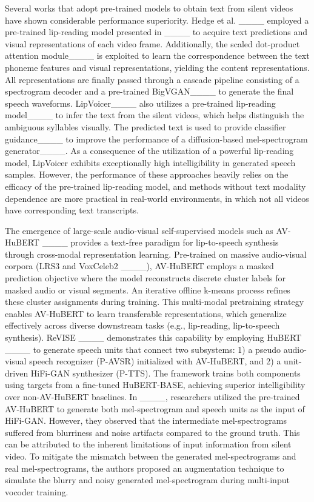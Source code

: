 Several works that adopt pre-trained models to obtain text from silent videos have shown considerable performance superiority. Hedge et al. ____ employed a pre-trained lip-reading model presented in ____ to acquire text predictions and visual representations of each video frame. Additionally, the scaled dot-product attention module____ is exploited to learn the correspondence between the text phoneme features and visual representations, yielding the content representations. All representations are finally passed through a cascade pipeline consisting of a spectrogram decoder and a pre-trained BigVGAN____ to generate the final speech waveforms. LipVoicer____ also utilizes a pre-trained lip-reading model____ to infer the text from the silent videos, which helps distinguish the ambiguous syllables visually. The predicted text is used to provide classifier guidance____ to improve the performance of a diffusion-based mel-spectrogram generator____. As a consequence of the utilization of a powerful lip-reading model, LipVoicer exhibits exceptionally high intelligibility in generated speech samples. However, the performance of these approaches heavily relies on the efficacy of the pre-trained lip-reading model, and methods without text modality dependence are more practical in real-world environments, in which not all videos have corresponding text transcripts. 

The emergence of large-scale audio-visual self-supervised models such as AV-HuBERT ____ provides a text-free paradigm for lip-to-speech synthesis through cross-modal representation learning. Pre-trained on massive audio-visual corpora (LRS3 and VoxCeleb2 ____), AV-HuBERT employs a masked prediction objective where the model reconstructs discrete cluster labels for masked audio or visual segments. An iterative offline k-means process refines these cluster assignments during training. This multi-modal pretraining strategy enables AV-HuBERT to learn transferable representations, which generalize effectively across diverse downstream tasks (e.g., lip-reading, lip-to-speech synthesis). ReVISE ____ demonstrates this capability by employing HuBERT ____ to generate speech units that connect two subsystems: 1) a pseudo audio-visual speech recognizer (P-AVSR) initialized with AV-HuBERT, and 2) a unit-driven HiFi-GAN synthesizer (P-TTS). The framework trains both components using targets from a fine-tuned HuBERT-BASE, achieving superior intelligibility over non-AV-HuBERT baselines. In ____, researchers utilized the pre-trained AV-HuBERT to generate both mel-spectrogram and speech units as the input of HiFi-GAN. However, they observed that the intermediate mel-spectrograms suffered from blurriness and noise artifacts compared to the ground truth. This can be attributed to the inherent limitations of input information from silent video. To mitigate the mismatch between the generated mel-spectrograms and real mel-spectrograms, the authors proposed an augmentation technique to simulate the blurry and noisy generated mel-spectrogram during multi-input vocoder training.

